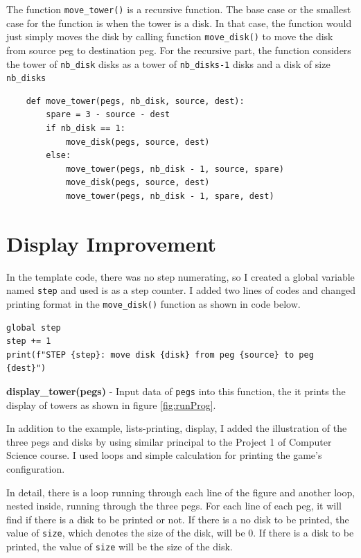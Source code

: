 \documentclass[12pt]{article}
\begin{document}
	The function \texttt{move\_tower()} is a recursive function. The base case or the smallest case for the function is when the tower is a disk. In that case, the function would just simply moves the disk by calling function \texttt{move\_disk()} to move the disk from source peg to destination peg. For the recursive part, the function considers the tower of \texttt{nb\_disk} disks as a tower of \texttt{nb\_disks-1} disks and a disk of size \texttt{nb\_disks} 
	
	\begin{verbatim}
    def move_tower(pegs, nb_disk, source, dest):
        spare = 3 - source - dest
        if nb_disk == 1:
            move_disk(pegs, source, dest)
        else:
            move_tower(pegs, nb_disk - 1, source, spare)
            move_disk(pegs, source, dest)
            move_tower(pegs, nb_disk - 1, spare, dest)
	\end{verbatim}

\section{Display Improvement}
    In the template code, there was no step numerating, so I created a global variable named \texttt{step} and used is as a step counter. I added two lines of codes and changed printing format in the \texttt{move\_disk()} function as shown in code below.
    
    \begin{verbatim}
global step
step += 1
print(f"STEP {step}: move disk {disk} from peg {source} to peg {dest}")
    \end{verbatim}

	\textbf{display\_tower(pegs)} - Input data of \texttt{pegs} into this function, the it prints the display of towers as shown in figure \ref{fig:runProg}.
	
	In addition to the example, lists-printing, display, I added the illustration of the three pegs and disks by using similar principal to the Project 1 of Computer Science course. I used loops and simple calculation for printing the game's configuration.
	
	In detail, there is a loop running through each line of the figure and another loop, nested inside, running through the three pegs. For each line of each peg, it will find if there is a disk to be printed or not. If there is a no disk to be printed, the value of \texttt{size}, which denotes the size of the disk, will be 0. If there is a disk to be printed, the value of \texttt{size} will be the size of the disk.
	
\end{document}
